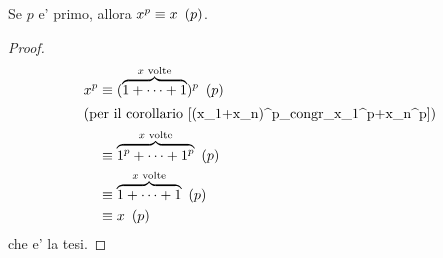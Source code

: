 \begin{theorem}
    Se $p$ e' primo, allora $x^p \equiv x \ \left(p\right)$.
\end{theorem}
\begin{proof}
    \begin{alignat*}{1}
        x^p &\equiv (\overbrace{1 +\dots+ 1}^{x \text{ volte}})^p \ \left(p\right)\\
        \intertext{(per il corollario \ref{(x_1+x_n)^p_congr_x_1^p+x_n^p})}
        &\equiv \overbrace{1^p +\dots+ 1^p}^{x \text{ volte}} \ \left(p\right)\\
        &\equiv \overbrace{1 +\dots+ 1}^{x \text{ volte}} \ \left(p\right)\\
        &\equiv x \ \left(p\right)
    \end{alignat*}
    che e' la tesi.
\end{proof}